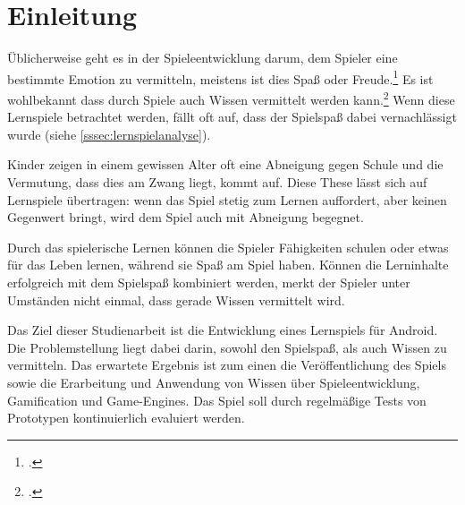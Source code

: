 \section{Einleitung}
	Üblicherweise geht es in der Spieleentwicklung darum, dem Spieler eine bestimmte Emotion zu vermitteln, meistens ist dies Spaß oder Freude.\footcite[Abstract]{persona} Es ist wohlbekannt dass durch Spiele auch Wissen vermittelt werden kann.\footcite{generalgameandlearning} Wenn diese Lernspiele betrachtet werden, fällt oft auf, dass der Spielspaß dabei vernachlässigt wurde (siehe \ref{sssec:lernspielanalyse}).

	Kinder zeigen in einem gewissen Alter oft eine Abneigung gegen Schule und die Vermutung, dass dies am Zwang liegt, kommt auf. Diese These lässt sich auf Lernspiele übertragen: wenn das Spiel stetig zum Lernen auffordert, aber keinen Gegenwert bringt, wird dem Spiel auch mit Abneigung begegnet.

	Durch das spielerische Lernen können die Spieler Fähigkeiten schulen oder etwas für das Leben lernen, während sie Spaß am Spiel haben. Können die Lerninhalte erfolgreich mit dem Spielspaß kombiniert werden, merkt der Spieler unter Umständen nicht einmal, dass gerade Wissen vermittelt wird.

	Das Ziel dieser Studienarbeit ist die Entwicklung eines Lernspiels für Android. Die Problemstellung liegt dabei darin, sowohl den Spielspaß, als auch Wissen zu vermitteln. Das erwartete Ergebnis ist zum einen die Veröffentlichung des Spiels sowie die Erarbeitung und Anwendung von Wissen über Spieleentwicklung, Gamification und Game-Engines. Das Spiel soll durch regelmäßige Tests von Prototypen kontinuierlich evaluiert werden.

